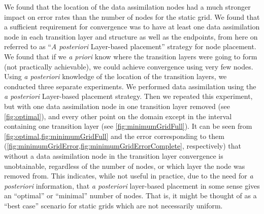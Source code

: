 \documentclass[12pt]{amsart}
\theoremstyle{plain}
\theoremstyle{definition}
\theoremstyle{remark}
\numberwithin{equation}{section} %
\numberwithin{figure}{section}   %
\begin{document}
We found that the location of the data assimilation nodes had a much stronger impact on error rates than the number of nodes for the static grid. We found that a sufficient requirement for convergence was to have at least one data assimilation node in each transition layer and structure as well as the endpoints, from here on referred to as ``\textit{A posteriori} Layer-based placement'' strategy for node placement. We found that if we \textit{a priori} know where the transition layers were going to form (not practically achievable), we could achieve convergence using very few nodes. Using \textit{a posteriori} knowledge of the location of the transition layers, we conducted three separate experiments. We performed data assimilation using the \textit{a posteriori} Layer-based placement strategy. Then we repeated this experiment, but with one data assimilation node in one transition layer removed (see \cref{fig:optimal}), and every other point on the domain except in the interval containing one transition layer (see \cref{fig:minimumGridFull}). It can be seen from \cref{fig:optimal,fig:minimumGridFull} and the error corresponding to them (\cref{fig:minimumGridError,fig:minimumGridErrorComplete}, respectively) that without a data assimilation node in the transition layer convergence is unobtainable, regardless of the number of nodes, or which layer the node was removed from. This indicates, while not useful in practice, due to the need for \textit{a posteriori} information, that \textit{a posteriori} layer-based placement in some sense gives an ``optimal'' or ``minimal'' number of nodes. That is, it might be thought of as a ``best case'' scenario for static grids which are not necessarily uniform.
\end{document}
